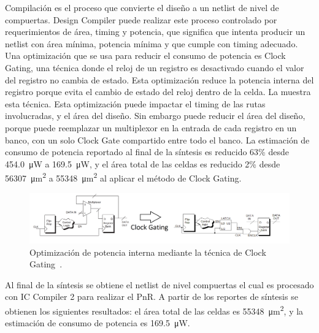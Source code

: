 \documentclass[a4paper, twoside, 11pt]{report}
\begin{document}
Compilación es el proceso que convierte el diseño a un netlist de nivel de compuertas. Design Compiler puede realizar este proceso controlado por requerimientos de área, timing y potencia, que significa que intenta producir un netlist con área mínima, potencia mínima y que cumple con timing adecuado. Una optimización que se usa para reducir el consumo de potencia es Clock Gating, una técnica donde el reloj de un registro es desactivado cuando el valor del registro no cambia de estado. Esta optimización reduce la potencia interna del registro porque evita el cambio de estado del reloj dentro de la celda. La  muestra esta técnica. Esta optimización puede impactar el timing de las rutas involucradas, y el área del diseño. Sin embargo puede reducir el área del diseño, porque puede reemplazar un multiplexor en la entrada de cada registro en un banco, con un solo Clock Gate compartido entre todo el banco. La estimación de consumo de potencia reportado al final de la síntesis es reducido 63\% desde \SI{454.0}{\micro\watt} a \SI{169.5}{\micro\watt}, y el área total de las celdas es reducido 2\% desde \SI{56307}{\micro\meter\squared} a \SI{55348}{\micro\meter\squared} al aplicar el método de Clock Gating.

\begin{figure}[htb]
  \centering
  \includegraphics[width=1.0\textwidth]{./img/clock_gating}
  \caption{Optimización de potencia interna mediante la técnica de Clock Gating~\cite[Adaptado de][]{power_compiler_ug}.}
  \label{fig:clock_gating}
\end{figure}

Al final de la síntesis se obtiene el netlist de nivel compuertas el cual es procesado con IC Compiler 2 para realizar el PnR. A partir de los reportes de síntesis se obtienen los siguientes resultados: el área total de las celdas es \SI{55348}{\micro\meter\squared}, y la estimación de consumo de potencia es \SI{169.5}{\micro\watt}.
\end{document}
